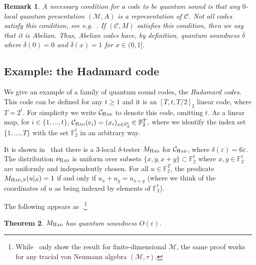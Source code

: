 \documentclass[11pt]{article}
\newtheorem{theorem}{Theorem}[section]
\newtheorem{remark}[theorem]{Remark}
\theoremstyle{definition}
\newcommand{\code}{\mathcal{C}}
\newcommand{\field}{\mathbb{F}_2}
\newcommand{\mC}{\ensuremath{\mathcal{C}}}
\newcommand{\mM}{\ensuremath{\mathcal{M}}}
\newcommand{\had}{\textsc{Had}}
\newcommand{\eps}{\varepsilon}
\begin{document}
\begin{remark}
A necessary condition for a code to be quantum sound is that any $0$-local quantum presentation $(\mM,A)$ is  a representation of $\mC$. Not all codes satisfy this condition, see e.g.~\cite[Example 2.16]{paddock2022arkhipov}. If $(\mC,M)$ satisfies this condition, then we say that it is \emph{Abelian}. Thus, Abelian codes have, by definition, quantum soundness $\overline{\delta}$ where $\overline{\delta}(0)=0$ and $\overline{\delta}(x)=1$ for $x\in(0,1]$. 
\end{remark}


		
		
\subsection{Example: the Hadamard code}
\label{sec:had}

We give an example of a family of quantum sound codes, the \emph{Hadamard codes}. This code can be defined for any  $t\geq 1$ and it is an $[T,t,T/2]_2$ linear code, where $T=2^t$. For simplicity we write  $\code_\had$ to denote this code, omitting $t$. As a linear map, for $i\in\{1,\ldots,t\}$, $\code_\had(e_i) = (x_i)_{x\in \field^t} \in \field^T$, where we identify the index set $\{1,\ldots,T\}$ with the set $\field^t$ in an arbitrary way.  

It is shown in~\cite{blum1990self} that there is a $3$-local $\delta$-tester $M_\had$ for $\code_\had$, where $\delta(\eps)=6\eps$. The distribution $\nu_\had$ is uniform over subsets $\{ x, y, x+y \} \subset \field^t$ where $x,y\in \field^t$ are uniformly and independently chosen. For all $u \in \field^T$, the predicate $M_{\had,S}(u|_S) = 1$ if and only if $u_x + u_y = u_{x+y}$ (where we think of the coordinates of $u$ as being indexed by elements of $\field^t$). 


The following appears as~\cite[Theorem 10]{natarajan2016robust}.\footnote{While~\cite{natarajan2016robust} only show the result for finite-dimensional $\mM$, the same proof works for any tracial von Neumann algebra $(\mM,\tau)$.}
 
\begin{theorem}\label{thm:had-qsound}
$M_\had$ has quantum soundness $O(\eps)$.
\end{theorem}
\end{document}
